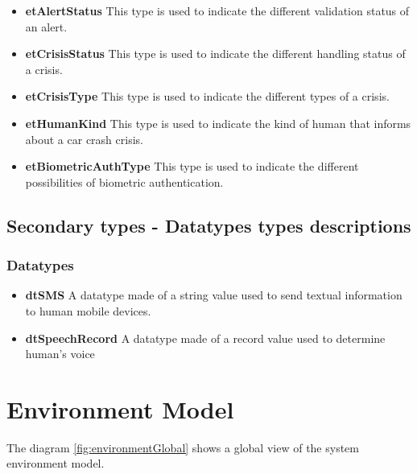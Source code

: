 \begin{itemize}
	\item \textbf{etAlertStatus}
	This type is used to indicate the different validation status of
	an alert.
	
	\item \textbf{etCrisisStatus}
	This type is used to indicate the different handling status of a
	crisis.
	
	\item \textbf{etCrisisType} 
	This type is used to indicate the different types of a crisis.
	
	\item \textbf{etHumanKind} 
	This type is used to indicate the kind of human that informs about a
	car crash crisis.
	
	\item \textbf{etBiometricAuthType}
	This type is used to indicate the different possibilities of biometric
	authentication.
\end{itemize}

\subsection{Secondary types - Datatypes types descriptions}

\subsubsection{Datatypes}
\begin{itemize}
  \item \textbf{dtSMS}
A datatype made of a string value used to send textual information to human
mobile devices. 
  \item \textbf{dtSpeechRecord}
  A datatype made of a record value used to determine human's voice 
\end{itemize}


   

\section{Environment Model}

The diagram \ref{fig:environmentGlobal} shows a global view of the \msricrash
system environment model.

